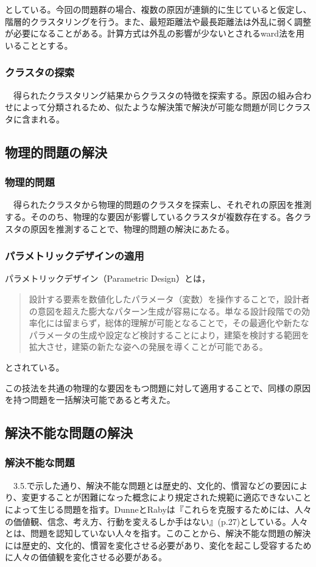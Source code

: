 \documentclass{jsarticle}
\begin{document}
としている。今回の問題群の場合、複数の原因が連鎖的に生じていると仮定し、階層的クラスタリングを行う。また、最短距離法や最長距離法は外乱に弱く調整が必要になることがある。計算方式は外乱の影響が少ないとされるward法を用いることとする。


\subsubsection{クラスタの探索}
　得られたクラスタリング結果からクラスタの特徴を探索する。原因の組み合わせによって分類されるため、似たような解決策で解決が可能な問題が同じクラスタに含まれる。

\newpage
\subsection{物理的問題の解決}
\subsubsection{物理的問題}

　得られたクラスタから物理的問題のクラスタを探索し、それぞれの原因を推測する。そののち、物理的な要因が影響しているクラスタが複数存在する。各クラスタの原因を推測することで、物理的問題の解決にあたる。

\subsubsection{パラメトリックデザインの適用}
パラメトリックデザイン（Parametric Design）\cite{Parametric}とは，
\begin{quotation}
設計する要素を数値化したパラメータ（変数）を操作することで，設計者の意図を超えた膨大なパターン生成が容易になる。単なる設計段階での効率化には留まらず，総体的理解が可能となることで，その最適化や新たなパラメータの生成や設定など検討することにより，建築を検討する範囲を拡大させ，建築の新たな姿への発展を導くことが可能である。
\end{quotation}

とされている。

この技法を共通の物理的な要因をもつ問題に対して適用することで、同様の原因を持つ問題を一括解決可能であると考えた。
\newpage
\subsection{解決不能な問題の解決}

\subsubsection{解決不能な問題}
　3.5.で示した通り、解決不能な問題とは歴史的、文化的、慣習などの要因により、変更することが困難になった概念により規定された規範に適応できないことによって生じる問題を指す。DunneとRabyは『これらを克服するためには、人々の価値観、信念、考え方、行動を変えるしか手はない』(p.27)としている。人々とは、問題を認知していない人々を指す。このことから、解決不能な問題の解決には歴史的、文化的、慣習を変化させる必要があり、変化を起こし受容するために人々の価値観を変化させる必要がある。
\end{document}
